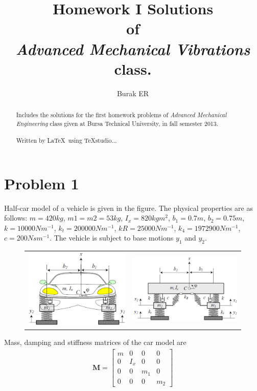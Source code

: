 \documentclass[]{report}
\title{Homework I Solutions \\ of \\ \emph{Advanced Mechanical Vibrations} class.}
\author{Burak ER}
\begin{document}
\maketitle
\begin{abstract}
Includes the solutions for the first homework problems of \emph{Advanced Mechanical Engineering} class given at Bursa Technical University, in fall semester 2013.
\\
\\
Written by \LaTeX ~using TeXstudio...
\end{abstract}
\section*{Problem 1}
Half-car model of a vehicle is given in the figure. The physical properties are as follows: $m=420kg$, $m1=m2=53kg$, $I_x=820 kgm^2$, $b_1=0.7m$, $b_2=0.75m$, $k =10000Nm^{-1}$, $k_t=200000 Nm^{-1}$, $kR=25000 Nm^{-1}$, $k_4= 1972900 Nm^{-1}$, $c=200 Nsm^{-1}$. The vehicle is subject to base motions $y_1$ and $y_2$.

\begin{figure}[ht!]
\begin{tabular}{cc}
 \includegraphics[width=0.5\linewidth]{./Figures/2st_Assignment} & \includegraphics[width=0.5\linewidth]{./Figures/2st_Assignment_1}
\end{tabular}
\label{fig:2st_Assignment}
\end{figure}
Mass, damping and stiffness matrices of the car model are
\begin{eqnarray*}
\mathbf{M}=\left[\begin{array}{cccc}
m&0&0&0\\
0&I_x&0&0 \\
0&0&m_1&0 \\
0&0&0&m_2
\end{array}\right]
\end{eqnarray*}
\end{document}
